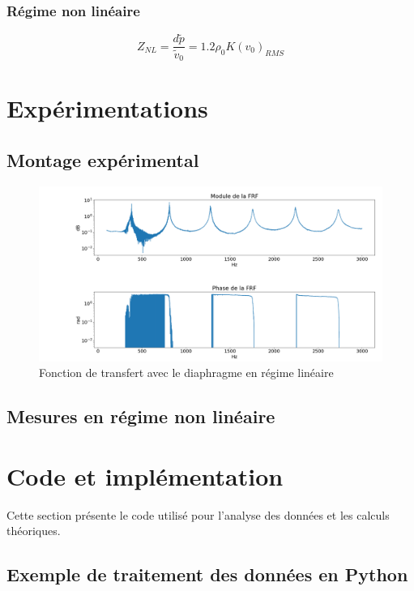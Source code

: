 \subsubsection{Régime non linéaire}

\begin{equation*}
    Z_{NL}=\frac{d\tilde{p}}{\tilde{v}_0}=1.2\rho_0K(v_0)_{RMS}
\end{equation*}

\section{Expérimentations}
\subsection{Montage expérimental}

\begin{figure}[!ht]
				\centering
				\includegraphics[scale=0.3, clip]{pics/frf_0007_ferme.png}
				\caption{Fonction de transfert avec le diaphragme en régime linéaire}
				\label{ferme}
\end{figure}


\newpage
\subsection{Mesures en régime non linéaire}


\section{Code et implémentation}

Cette section présente le code utilisé pour l'analyse des données et les calculs théoriques.

\subsection{Exemple de traitement des données en Python}

